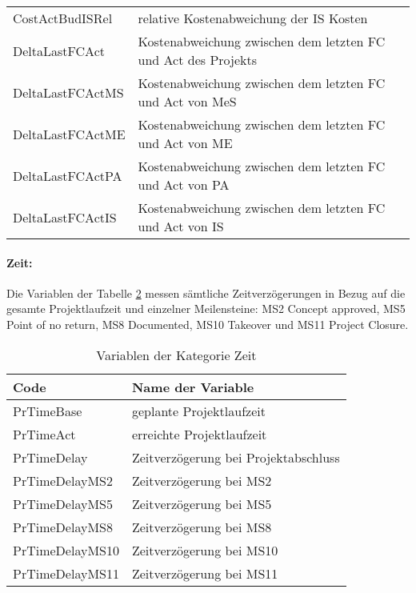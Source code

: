 \begin{table}[H]
\begin{tabular}{ll}
		CostActBudISRel & relative Kostenabweichung der IS Kosten \\
		DeltaLastFCAct & Kostenabweichung zwischen dem letzten FC und Act des Projekts \\
		DeltaLastFCActMS & Kostenabweichung zwischen dem letzten FC und Act von MeS \\
		DeltaLastFCActME & Kostenabweichung zwischen dem letzten FC und Act von ME \\
		DeltaLastFCActPA & Kostenabweichung zwischen dem letzten FC und Act von PA \\
		DeltaLastFCActIS & Kostenabweichung zwischen dem letzten FC und Act von IS \\
		\bottomrule
	\end{tabular}%
	\label{tab:costvar}%
\end{table}%
\paragraph{Zeit:} Die Variablen der Tabelle \ref{tab:zeitvar} messen sämtliche Zeitverzögerungen in Bezug auf die gesamte Projektlaufzeit und einzelner Meilensteine: MS2 \glqq Concept approved\grqq, MS5 \glqq Point of no return\grqq, MS8 \glqq Documented\grqq, MS10 \glqq Takeover\grqq{} und MS11 \glqq Project Closure\grqq.
\begin{table}[htbp]
	\centering
	\caption{Variablen der Kategorie Zeit}
	\begin{tabular}{ll}
		\toprule
		\textbf{Code} & \textbf{Name der Variable} \\
		\midrule
		PrTimeBase & geplante Projektlaufzeit \\
		PrTimeAct & erreichte Projektlaufzeit \\
		PrTimeDelay & Zeitverzögerung bei Projektabschluss \\
		PrTimeDelayMS2 & Zeitverzögerung bei MS2 \\
		PrTimeDelayMS5 & Zeitverzögerung bei MS5 \\
		PrTimeDelayMS8 & Zeitverzögerung bei MS8 \\
		PrTimeDelayMS10 & Zeitverzögerung bei MS10 \\
		PrTimeDelayMS11 & Zeitverzögerung bei MS11 \\
		\bottomrule
	\end{tabular}%
	\label{tab:zeitvar}%
\end{table}%
